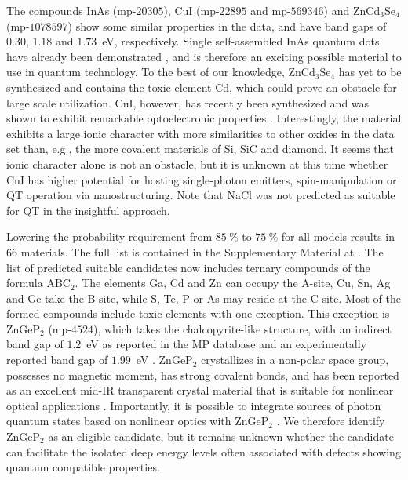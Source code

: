 \documentclass[superscriptaddress,unsortedaddress,
 amsmath,amssymb,
 aps,
]{revtex4-2}
\begin{document}
The compounds InAs (mp-$20305$), CuI (mp-$22895$ and mp-$569346$) and ZnCd$_3$Se$_4$ (mp-$1078597$) show some similar properties in the data, and have band gaps of $0.30$, $1.18$ and $1.73$~eV, respectively. Single self-assembled InAs quantum dots have already been demonstrated \cite{Liu2018}, and is therefore an exciting possible material to use in quantum technology. To the best of our knowledge, ZnCd$_3$Se$_4$ has yet to be synthesized and contains the toxic element Cd, which could prove an obstacle for large scale utilization. CuI, however, has recently been synthesized and was shown to exhibit remarkable optoelectronic properties \cite{Ahn2020}. Interestingly, the material exhibits a large ionic character with more similarities to other oxides in the data set than, e.g., the more covalent materials of Si, SiC and diamond.  
It seems that ionic character alone is not an obstacle, but it is unknown at this time whether CuI has higher potential for hosting single-photon emitters, spin-manipulation or QT operation via nanostructuring. 
Note that NaCl was not predicted as suitable for QT in the insightful approach. 

Lowering the probability requirement from $85 \ \%$ to $75 \ \%$ for all models results in $66$ materials. 
The full list is contained in the Supplementary Material at \cite{supplementary}. 
The list of predicted suitable candidates now includes ternary compounds of the formula ABC$_2$. The elements Ga, Cd and Zn can occupy the A-site, Cu, Sn, Ag and Ge take the B-site, while S, Te, P or As may reside at the C site. Most of the formed compounds include toxic elements with one exception. This exception is ZnGeP$_2$ (mp-$4524$), which takes the chalcopyrite-like structure, with an indirect band gap of $1.2$~eV \cite{Zhang2015} as reported in the MP database and an experimentally reported band gap of $1.99$~eV \cite{Xing1989}.
ZnGeP$_2$ crystallizes in a non-polar space group, possesses no magnetic moment, has strong covalent bonds, and has been reported as an excellent mid-IR transparent crystal material that is suitable for nonlinear optical applications \cite{Zhang2015}. Importantly, it is possible to integrate sources of photon quantum states based on nonlinear optics with ZnGeP$_2$ \cite{Caspani2017}. 
We therefore identify ZnGeP$_2$ as an eligible candidate, but it remains unknown  
whether the candidate can facilitate the isolated deep energy levels often associated with defects showing quantum compatible properties. 
\end{document}
